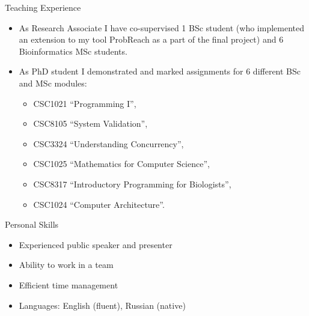 \documentclass{resume} %
\begin{document}
\begin{rSection}{Teaching Experience}
\begin{itemize}
	\item As Research Associate I have co-supervised 1 BSc student (who implemented an extension
	to my tool ProbReach as a part of the final project)
	and 6 Bioinformatics MSc students.

	\item As PhD student I demonstrated and marked assignments for 6 different
	 BSc and MSc modules:
	\begin{itemize}
		\item CSC1021 ``Programming I'',
		\item CSC8105 ``System Validation'',
		\item CSC3324 ``Understanding Concurrency'',
		\item CSC1025 ``Mathematics for Computer Science'',
		\item CSC8317 ``Introductory Programming for Biologists'',
		\item CSC1024 ``Computer Architecture''.
	\end{itemize}
\end{itemize}
\end{rSection}


\begin{rSection}{Personal Skills}
\begin{itemize}
	\item Experienced public speaker and presenter
	\item Ability to work in a team
	\item Efficient time management
	\item Languages: English (fluent), Russian (native)
\end{itemize}
\end{rSection}








\end{document}
